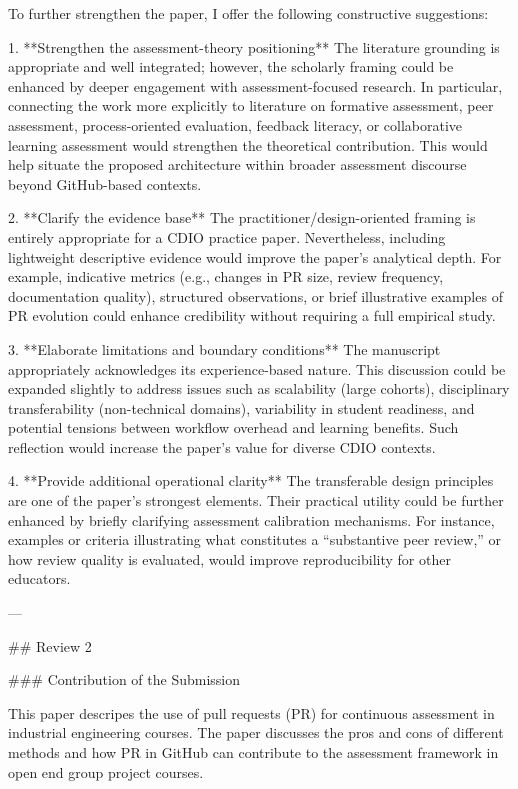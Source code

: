 To further strengthen the paper, I offer the following constructive suggestions:

1. **Strengthen the assessment-theory positioning**  
The literature grounding is appropriate and well integrated; however, the scholarly framing could be enhanced by deeper engagement with assessment-focused research. In particular, connecting the work more explicitly to literature on formative assessment, peer assessment, process-oriented evaluation, feedback literacy, or collaborative learning assessment would strengthen the theoretical contribution. This would help situate the proposed architecture within broader assessment discourse beyond GitHub-based contexts.

2. **Clarify the evidence base**  
The practitioner/design-oriented framing is entirely appropriate for a CDIO practice paper. Nevertheless, including lightweight descriptive evidence would improve the paper’s analytical depth. For example, indicative metrics (e.g., changes in PR size, review frequency, documentation quality), structured observations, or brief illustrative examples of PR evolution could enhance credibility without requiring a full empirical study.

3. **Elaborate limitations and boundary conditions**  
The manuscript appropriately acknowledges its experience-based nature. This discussion could be expanded slightly to address issues such as scalability (large cohorts), disciplinary transferability (non-technical domains), variability in student readiness, and potential tensions between workflow overhead and learning benefits. Such reflection would increase the paper’s value for diverse CDIO contexts.

4. **Provide additional operational clarity**  
The transferable design principles are one of the paper’s strongest elements. Their practical utility could be further enhanced by briefly clarifying assessment calibration mechanisms. For instance, examples or criteria illustrating what constitutes a “substantive peer review,” or how review quality is evaluated, would improve reproducibility for other educators.

---

## Review 2

### Contribution of the Submission

This paper descripes the use of pull requests (PR) for continuous assessment in industrial engineering courses. The paper discusses the pros and cons of different methods and how PR in GitHub can contribute to the assessment framework in open end group project courses.

